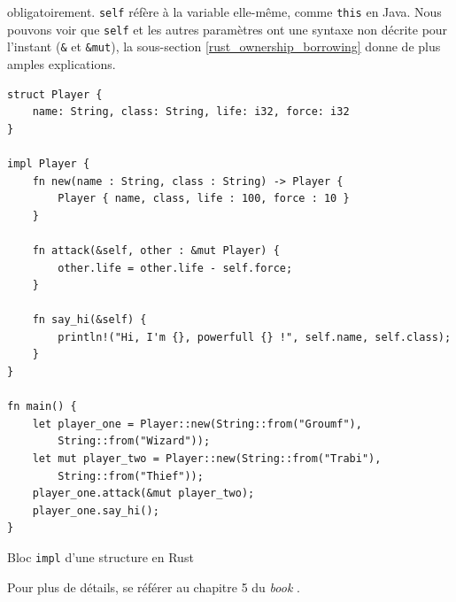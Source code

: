 \documentclass[a4paper, 12pt]{article}
\newenvironment{code}{\captionsetup{type=listing}}{}
\begin{document}
obligatoirement. \texttt{self} réfère à la variable elle-même, comme \texttt{this} 
en Java. Nous pouvons voir que \texttt{self} et les autres paramètres ont une syntaxe non 
décrite pour l'instant (\texttt{&} et \texttt{&mut}), la sous-section 
\ref{rust_ownership_borrowing} donne de plus amples explications.
\bigbreak
\begin{code}
    \begin{verbatim}
struct Player {
    name: String, class: String, life: i32, force: i32
}

impl Player {
    fn new(name : String, class : String) -> Player {
        Player { name, class, life : 100, force : 10 }
    }

    fn attack(&self, other : &mut Player) {
        other.life = other.life - self.force;
    }

    fn say_hi(&self) {
        println!("Hi, I'm {}, powerfull {} !", self.name, self.class);
    }
}

fn main() {
    let player_one = Player::new(String::from("Groumf"),
        String::from("Wizard"));
    let mut player_two = Player::new(String::from("Trabi"),
        String::from("Thief"));
    player_one.attack(&mut player_two);
    player_one.say_hi();
}
    \end{verbatim}
    \caption{Bloc \texttt{impl} d'une structure en Rust}
    \label{rust_struct_impl}
\end{code}
\bigbreak
Pour plus de détails, se référer au chapitre 5 du \textit{book} \cite{ref0}.
\end{document}
